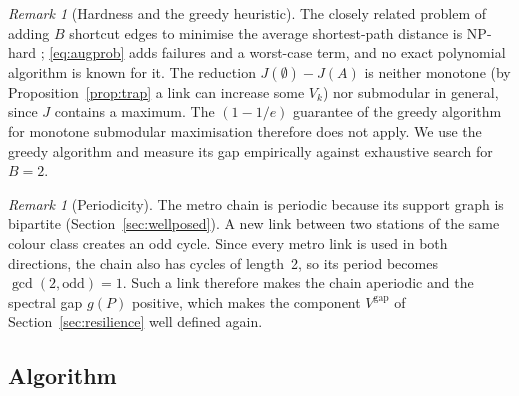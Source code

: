 \documentclass[12pt,a4paper]{article}
\theoremstyle{plain}
\theoremstyle{definition}
\theoremstyle{remark}
\newtheorem{remark}[theorem]{Remark}
\begin{document}
\begin{remark}[Hardness and the greedy heuristic]
The closely related problem of adding $B$ shortcut edges to minimise the
average shortest-path distance is NP-hard \citep{meyerson2009};
\eqref{eq:augprob} adds failures and a worst-case term, and no exact
polynomial algorithm is known for it.  The reduction $J(\emptyset)-J(A)$ is
neither monotone (by Proposition~\ref{prop:trap} a link can increase some
$V_k$) nor submodular in general, since $J$ contains a maximum.  The
$(1-1/e)$ guarantee of the greedy algorithm for monotone submodular
maximisation \citep{nemhauser1978} therefore does not apply.  We use the greedy algorithm
and measure its gap empirically against exhaustive search for $B=2$.
\end{remark}

\begin{remark}[Periodicity]
\label{rem:periodic}
The metro chain is periodic because its support graph is bipartite
(Section~\ref{sec:wellposed}).  A new link between two stations of the same
colour class creates an odd cycle.  Since every metro link is used in both
directions, the chain also has cycles of length~2, so its period becomes
$\gcd(2,\text{odd})=1$.  Such a link therefore makes the chain aperiodic and
the spectral gap $g(P)$ positive, which makes the component $V^{\mathrm{gap}}$
of Section~\ref{sec:resilience} well defined again.
\end{remark}

\subsection{Algorithm}
\end{document}
